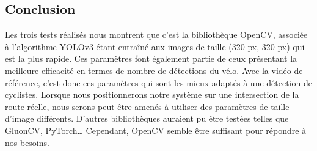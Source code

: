 \subsection{Conclusion}
\label{sec:comparaisonIA:conclusion}

Les trois tests réalisés nous montrent que c'est la bibliothèque OpenCV,
associée à l'algorithme YOLOv3 étant entraîné aux images de taille (320 px, 320 px) qui est la plus rapide.
Ces paramètres font également partie de ceux présentant la meilleure efficacité en termes de nombre de détections du vélo.
Avec la vidéo de référence, c'est donc ces paramètres qui sont les mieux adaptés à une détection de cyclistes.
Lorsque nous positionnerons notre système sur une intersection de la route réelle, 
nous serons peut-être amenés à utiliser des paramètres de taille d'image différents.
D'autres bibliothèques auraient pu être testées telles que GluonCV, PyTorch\dots
Cependant, OpenCV semble être suffisant pour répondre à nos besoins.
